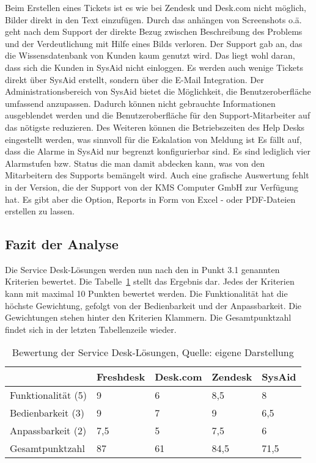 Beim Erstellen eines Tickets ist es wie bei Zendesk und Desk.com nicht möglich, Bilder direkt in den Text einzufügen. Durch das anhängen von Screenshots o.ä. geht nach dem Support der direkte Bezug zwischen Beschreibung des Problems und der Verdeutlichung mit Hilfe eines Bilds verloren.\newline
Der Support gab an, das die Wissensdatenbank von Kunden kaum genutzt wird. Das liegt wohl daran, dass sich die Kunden in SysAid nicht einloggen. Es werden auch wenige Tickets direkt über SysAid erstellt, sondern über die E-Mail Integration.\newline
Der Administrationsbereich von SysAid bietet die Möglichkeit, die Benutzeroberfläche umfassend anzupassen. Dadurch können nicht gebrauchte Informationen ausgeblendet werden und die Benutzeroberfläche für den Support-Mitarbeiter auf das nötigste reduzieren. Des Weiteren können die Betriebszeiten des Help Desks eingestellt werden, was sinnvoll für die Eskalation von Meldung ist\newline
Es fällt auf, dass die Alarme in SysAid nur begrenzt konfigurierbar sind. Es sind lediglich vier Alarmstufen bzw. Status die man damit abdecken kann, was von den Mitarbeitern des Supports bemängelt wird. Auch eine grafische Auswertung fehlt in der Version, die der Support von der KMS Computer GmbH zur Verfügung hat. Es gibt aber die Option, Reports in Form von Excel - oder PDF-Dateien erstellen zu lassen.\\

\subsection{Fazit der Analyse}

\noindent
Die Service Desk-Lösungen werden nun nach den in Punkt 3.1 genannten Kriterien bewertet. Die Tabelle~\ref{tab:Auswertung} stellt das Ergebnis dar. Jedes der Kriterien kann mit maximal 10 Punkten bewertet werden. Die Funktionalität hat die höchste Gewichtung, gefolgt von der Bedienbarkeit und der Anpassbarkeit. Die Gewichtungen stehen hinter den Kriterien Klammern. Die Gesamtpunktzahl findet sich in der letzten Tabellenzeile wieder.\\

\begin{table}[h!]
    \begin{tabular}{ | p{3.5cm}| p{2.5cm} | p{2.5cm} | p{2.5cm} | p{2.5cm} |}
    \hline
       & Freshdesk & Desk.com & Zendesk & SysAid \\ \hline
   Funktionalität (5) & 9 & 6 & 8,5 & 8 \\ \hline
   Bedienbarkeit (3) & 9 & 7 & 9 & 6,5 \\ \hline
   Anpassbarkeit (2) & 7,5 & 5 & 7,5 & 6 \\ \hline
   Gesamtpunktzahl & 87 & 61 & 84,5 & 71,5 \\ \hline
    \end{tabular}
    \caption{Bewertung der Service Desk-Lösungen, Quelle: eigene Darstellung}
    \label{tab:Auswertung}
\end{table}

